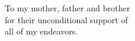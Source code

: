 \chapter*{}


	
\vspace*{\fill}
	
	\begin{center}
			
			To my mother, father and brother\\
			for their unconditional support of\\
			all of my endeavors.\\
			
	\end{center}
	
\vspace*{\fill}

\clearpage
	
	
